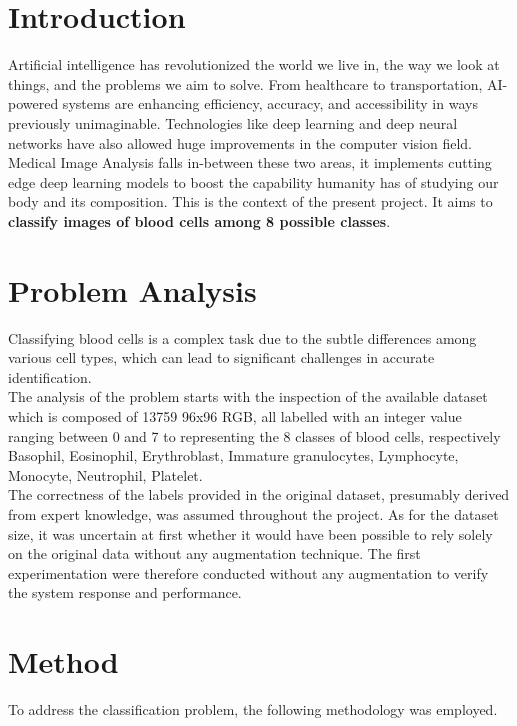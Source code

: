 \documentclass[11pt]{article}
\begin{document}
    \begin{multicols}{2}
    
    \section{Introduction}
        
        Artificial intelligence has revolutionized the world we live in, the way we look at things, and the problems we aim to solve. From healthcare to transportation, AI-powered systems are enhancing efficiency, accuracy, and accessibility in ways previously unimaginable. Technologies like deep learning and deep neural networks have also allowed huge improvements in the computer vision field. 
        \\
        Medical Image Analysis falls in-between these two areas, it implements cutting edge deep learning models to boost the capability humanity has of studying our body and its composition. This is the context of the present project. It aims to \textbf{classify images of blood cells among 8 possible classes}. 

        
    \section{Problem Analysis}

       Classifying blood cells is a complex task due to the subtle differences among various cell types, which can lead to significant challenges in accurate identification.\\
        The analysis of the problem starts with the inspection of the available dataset which is composed of 13759 96x96 RGB, all labelled with an integer value ranging between 0 and 7 to representing the 8 classes of blood cells, respectively Basophil, Eosinophil, Erythroblast, Immature granulocytes, Lymphocyte, Monocyte, Neutrophil, Platelet.\\
        
        The correctness of the labels provided in the original dataset, presumably derived from expert knowledge, was assumed throughout the project.
        As for the dataset size, it was uncertain at first whether it would have been possible to rely solely on the original data without any augmentation technique. The first experimentation were therefore conducted without any augmentation to verify the system response and performance.	 

    
    \section{Method}
        \label{sec:method}
        To address the classification problem, the following methodology was employed.
        

\end{multicols}
\end{document}

